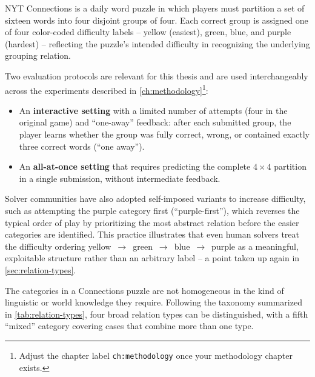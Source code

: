 NYT Connections is a daily word puzzle in which players must partition a
set of sixteen words into four disjoint groups of four. Each correct
group is assigned one of four color-coded difficulty labels -- yellow
(easiest), green, blue, and purple (hardest) -- reflecting the puzzle's
intended difficulty in recognizing the underlying grouping relation.

Two evaluation protocols are relevant for this thesis and are used
interchangeably across the experiments described in
\autoref{ch:methodology}\footnote{Adjust the chapter label
\texttt{ch:methodology} once your methodology chapter exists.}:

\begin{itemize}
  \item An \textbf{interactive setting} with a limited number of attempts
  (four in the original game) and ``one-away'' feedback: after each
  submitted group, the player learns whether the group was fully correct,
  wrong, or contained exactly three correct words (``one away'').
  \item An \textbf{all-at-once setting} that requires predicting the
  complete $4\times4$ partition in a single submission, without
  intermediate feedback.
\end{itemize}

Solver communities have also adopted self-imposed variants to increase
difficulty, such as attempting the purple category first
(``purple-first''), which reverses the typical order of play by
prioritizing the most abstract relation before the easier categories are
identified. This practice illustrates that even human solvers treat the
difficulty ordering yellow~$\rightarrow$~green~$\rightarrow$~blue~$\rightarrow$~purple
as a meaningful, exploitable structure rather than an arbitrary label --
a point taken up again in \autoref{sec:relation-types}.

\label{sec:relation-types}

The categories in a Connections puzzle are not homogeneous in the kind of
linguistic or world knowledge they require. Following the taxonomy
summarized in \autoref{tab:relation-types}, four broad relation types
can be distinguished, with a fifth ``mixed'' category covering cases that
combine more than one type.

